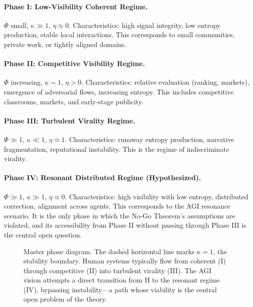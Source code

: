 \documentclass[12pt,a4paper]{article}
\begin{document}
\paragraph{Phase I: Low-Visibility Coherent Regime.}
$\Phi$ small, $\kappa \gg 1$, $\eta \approx 0$. Characteristics: high signal integrity, low entropy production, stable local interactions. This corresponds to small communities, private work, or tightly aligned domains.

\paragraph{Phase II: Competitive Visibility Regime.}
$\Phi$ increasing, $\kappa \sim 1$, $\eta > 0$. Characteristics: relative evaluation (ranking, markets), emergence of adversarial flows, increasing entropy. This includes competitive classrooms, markets, and early-stage publicity.

\paragraph{Phase III: Turbulent Virality Regime.}
$\Phi \gg 1$, $\kappa \ll 1$, $\eta \approx 1$. Characteristics: runaway entropy production, narrative fragmentation, reputational instability. This is the regime of indiscriminate virality.

\paragraph{Phase IV: Resonant Distributed Regime (Hypothesized).}
$\Phi \gg 1$, $\kappa \gg 1$, $\eta \approx 0$. Characteristics: high visibility with low entropy, distributed correction, alignment across agents. This corresponds to the AGI resonance scenario. It is the only phase in which the No-Go Theorem's assumptions are violated, and its accessibility from Phase II without passing through Phase III is the central open question.

\begin{figure}[htbp]
\centering
{}
\caption{Master phase diagram. The dashed horizontal line marks $\kappa=1$, the stability boundary. Human systems typically flow from coherent (I) through competitive (II) into turbulent virality (III). The AGI vision attempts a direct transition from II to the resonant regime (IV), bypassing instability—a path whose viability is the central open problem of the theory.}
\end{figure}
\end{document}

